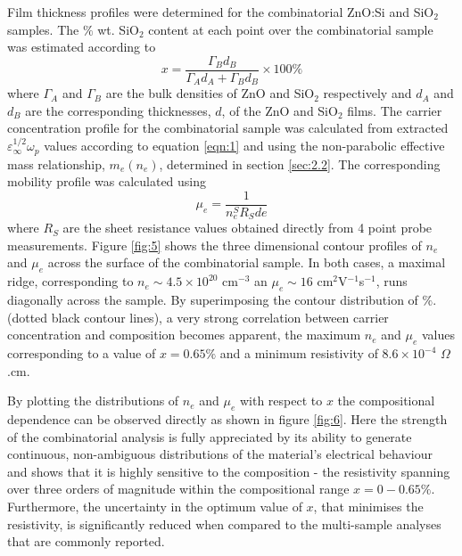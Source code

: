 \documentclass[aps,prl,preprint,showpacs,showkeys, linenumbers]{revtex4-1}
\begin{document}
Film thickness profiles were determined for the combinatorial ZnO:Si and SiO$_{2}$ samples. The $\%$ wt. SiO$_{2}$ content at each point over the combinatorial sample was estimated according to
\begin{equation}
\label{eqn:8}
x = \frac{\Gamma_{B}d_{B}}{\Gamma_Ad_A+\Gamma_{B}d_{B}}\times100\%
\end{equation}
where $\Gamma_A$ and $\Gamma_B$ are the bulk densities of ZnO and SiO$_{2}$ respectively and $d_A$ and $d_B$ are the corresponding thicknesses, $d$, of the ZnO and SiO$_{2}$ films. The carrier concentration profile for the combinatorial sample was calculated from extracted $\varepsilon_{\infty}^{1/2}\omega_p$ values according to equation \ref{eqn:1} and using the non-parabolic effective mass relationship, $m_e(n_e)$, determined in section \ref{sec:2.2}. The corresponding mobility profile was calculated using
\begin{equation}
\label{eqn:9}
\mu_e=\frac{1}{n_e^SR_Sde}
\end{equation}
where $R_S$ are the sheet resistance values obtained directly from 4 point probe measurements. Figure \ref{fig:5} shows the three dimensional contour profiles of $n_e$ and $\mu_e$ across the surface of the combinatorial sample. In both cases, a maximal ridge, corresponding to $n_e\sim 4.5\times10^{20}$ cm$^{-3}$ an $\mu_e \sim 16$ cm$^2$V$^{-1}$s$^{-1}$, runs diagonally across the sample. By superimposing the contour distribution of $\%$. (dotted black contour lines), a very strong correlation between carrier concentration and composition becomes apparent, the maximum $n_e$ and $\mu_e$ values corresponding to a value of $x=0.65\%$ and a minimum resistivity of $8.6\times10^{-4}$ $\Omega$.cm.

By plotting the distributions of $n_e$ and $\mu_e$ with respect to $x$ the compositional dependence can be observed directly as shown in figure \ref{fig:6}. Here the strength of the combinatorial analysis is fully appreciated by its ability to generate continuous, non-ambiguous distributions of the material's electrical behaviour and shows that it is highly sensitive to the composition - the resistivity spanning over three orders of magnitude within the compositional range $x = 0 - 0.65\%$. Furthermore, the uncertainty in the optimum value of $x$, that minimises the resistivity, is significantly reduced when compared to the multi-sample analyses that are commonly reported. 
\end{document}
